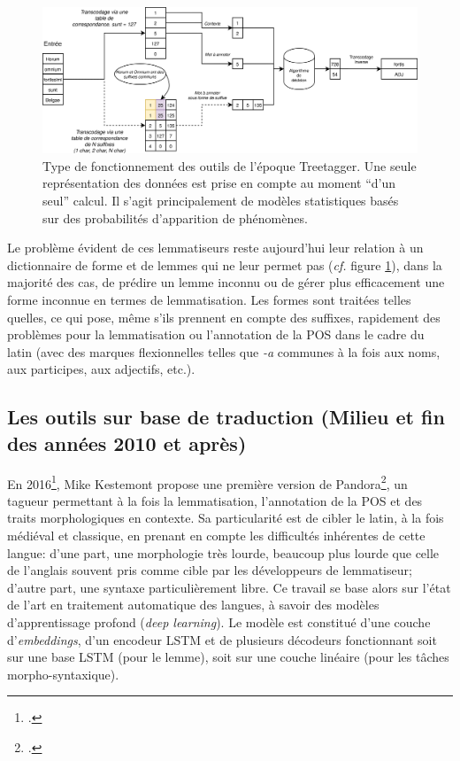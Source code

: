 \begin{figure}[h]
    \centering
    \includegraphics[width=\linewidth]{figures/chap3/outils/treetagger_type.png}
    \caption{Type de fonctionnement des outils de l'époque Treetagger. Une seule représentation des données est prise en compte au moment \enquote{d'un seul} calcul. Il s'agit principalement de modèles statistiques basés sur des probabilités d'apparition de phénomènes.}
    \label{lemmatisation:outils:type-treetagger}
\end{figure}

Le problème évident de ces lemmatiseurs reste aujourd'hui leur relation à un dictionnaire de forme et de lemmes qui ne leur permet pas (\textit{cf.} figure \ref{lemmatisation:outils:type-treetagger}), dans la majorité des cas, de prédire un lemme inconnu ou de gérer plus efficacement une forme inconnue en termes de lemmatisation. Les formes sont traitées telles quelles, ce qui pose, même s'ils prennent en compte des suffixes, rapidement des problèmes pour la lemmatisation ou l'annotation  de la POS dans le cadre du latin (avec des marques flexionnelles telles que \textit{-a} communes à la fois aux noms, aux participes, aux adjectifs, etc.).%

\subsection{Les outils sur base de traduction (Milieu et fin des années 2010 et après)}

En 2016\footcite{kestemont_initial_2016}, Mike Kestemont propose une première version de Pandora\footcite{kestemont_lemmatization_2017}, un tagueur permettant à la fois la lemmatisation, l'annotation de la POS et des traits morphologiques en contexte. Sa particularité est de cibler le latin, à la fois médiéval et classique, en prenant en compte les difficultés inhérentes de cette langue: d'une part, une morphologie très lourde, beaucoup plus lourde que celle de l'anglais souvent pris comme cible par les développeurs de lemmatiseur; d'autre part, une syntaxe particulièrement libre. Ce travail se base alors sur l'état de l'art en traitement automatique des langues, à savoir des modèles d'apprentissage profond (\textit{deep learning}). Le modèle est constitué d'une couche d'\textit{embeddings}, d'un encodeur LSTM et de plusieurs décodeurs fonctionnant soit sur une base LSTM (pour le lemme), soit sur une couche linéaire (pour les tâches morpho-syntaxique).


